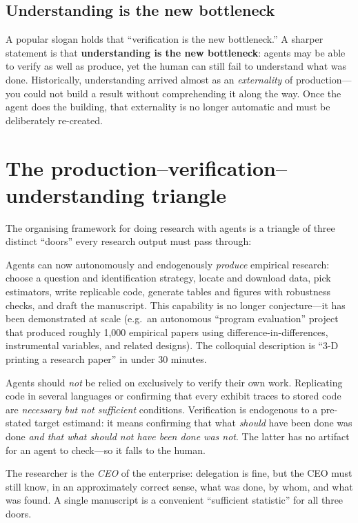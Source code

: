 \documentclass[11pt]{article}
\begin{document}
\subsection{Understanding is the new bottleneck}
A popular slogan holds that ``verification is the new bottleneck.'' A sharper
statement is that \textbf{understanding is the new bottleneck}: agents may be
able to verify as well as produce, yet the human can still fail to understand
what was done. Historically, understanding arrived almost as an
\emph{externality} of production---you could not build a result without
comprehending it along the way. Once the agent does the building, that
externality is no longer automatic and must be deliberately re-created.

\section{The production--verification--understanding triangle}

The organising framework for doing research with agents is a triangle of three
distinct ``doors'' every research output must pass through:

\begin{description}[leftmargin=1.6em, style=nextline]
  \item[\textbf{Production.}] Agents can now autonomously and endogenously
  \emph{produce} empirical research: choose a question and identification
  strategy, locate and download data, pick estimators, write replicable code,
  generate tables and figures with robustness checks, and draft the manuscript.
  This capability is no longer conjecture---it has been demonstrated at scale
  (e.g.\ an autonomous ``program evaluation'' project that produced roughly
  1{,}000 empirical papers using difference-in-differences, instrumental
  variables, and related designs). The colloquial description is
  ``3-D printing a research paper'' in under 30 minutes.
  \item[\textbf{Verification.}] Agents should \emph{not} be relied on
  exclusively to verify their own work. Replicating code in several languages or
  confirming that every exhibit traces to stored code are \emph{necessary but
  not sufficient} conditions. Verification is endogenous to a pre-stated target
  estimand: it means confirming that what \emph{should} have been done was done
  \emph{and that what should not have been done was not}. The latter has no
  artifact for an agent to check---so it falls to the human.
  \item[\textbf{Understanding.}] The researcher is the \emph{CEO} of the
  enterprise: delegation is fine, but the CEO must still know, in an
  approximately correct sense, what was done, by whom, and what was found. A
  single manuscript is a convenient ``sufficient statistic'' for all three
  doors.
\end{description}
\end{document}
